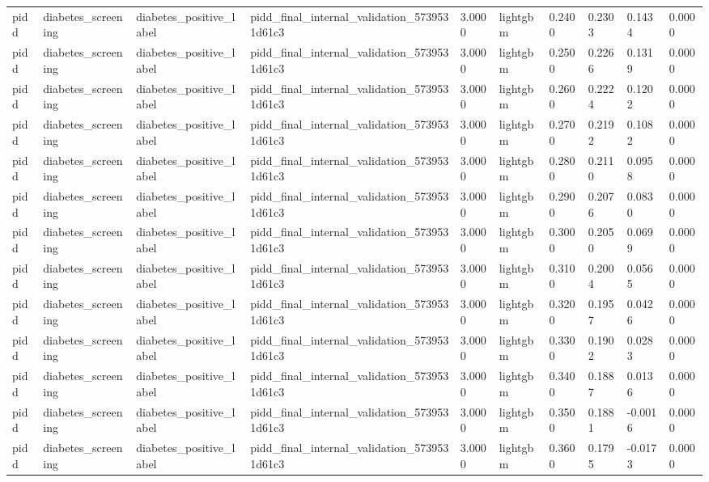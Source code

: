 \begin{tabular}{llllllllll}
pidd & diabetes\_screening & diabetes\_positive\_label & pidd\_final\_internal\_validation\_5739531d61c3 & 3.0000 & lightgbm & 0.2400 & 0.2303 & 0.1434 & 0.0000 \\
pidd & diabetes\_screening & diabetes\_positive\_label & pidd\_final\_internal\_validation\_5739531d61c3 & 3.0000 & lightgbm & 0.2500 & 0.2266 & 0.1319 & 0.0000 \\
pidd & diabetes\_screening & diabetes\_positive\_label & pidd\_final\_internal\_validation\_5739531d61c3 & 3.0000 & lightgbm & 0.2600 & 0.2224 & 0.1202 & 0.0000 \\
pidd & diabetes\_screening & diabetes\_positive\_label & pidd\_final\_internal\_validation\_5739531d61c3 & 3.0000 & lightgbm & 0.2700 & 0.2192 & 0.1082 & 0.0000 \\
pidd & diabetes\_screening & diabetes\_positive\_label & pidd\_final\_internal\_validation\_5739531d61c3 & 3.0000 & lightgbm & 0.2800 & 0.2110 & 0.0958 & 0.0000 \\
pidd & diabetes\_screening & diabetes\_positive\_label & pidd\_final\_internal\_validation\_5739531d61c3 & 3.0000 & lightgbm & 0.2900 & 0.2076 & 0.0830 & 0.0000 \\
pidd & diabetes\_screening & diabetes\_positive\_label & pidd\_final\_internal\_validation\_5739531d61c3 & 3.0000 & lightgbm & 0.3000 & 0.2050 & 0.0699 & 0.0000 \\
pidd & diabetes\_screening & diabetes\_positive\_label & pidd\_final\_internal\_validation\_5739531d61c3 & 3.0000 & lightgbm & 0.3100 & 0.2004 & 0.0565 & 0.0000 \\
pidd & diabetes\_screening & diabetes\_positive\_label & pidd\_final\_internal\_validation\_5739531d61c3 & 3.0000 & lightgbm & 0.3200 & 0.1957 & 0.0426 & 0.0000 \\
pidd & diabetes\_screening & diabetes\_positive\_label & pidd\_final\_internal\_validation\_5739531d61c3 & 3.0000 & lightgbm & 0.3300 & 0.1902 & 0.0283 & 0.0000 \\
pidd & diabetes\_screening & diabetes\_positive\_label & pidd\_final\_internal\_validation\_5739531d61c3 & 3.0000 & lightgbm & 0.3400 & 0.1887 & 0.0136 & 0.0000 \\
pidd & diabetes\_screening & diabetes\_positive\_label & pidd\_final\_internal\_validation\_5739531d61c3 & 3.0000 & lightgbm & 0.3500 & 0.1881 & -0.0016 & 0.0000 \\
pidd & diabetes\_screening & diabetes\_positive\_label & pidd\_final\_internal\_validation\_5739531d61c3 & 3.0000 & lightgbm & 0.3600 & 0.1795 & -0.0173 & 0.0000 \\

\end{tabular}
